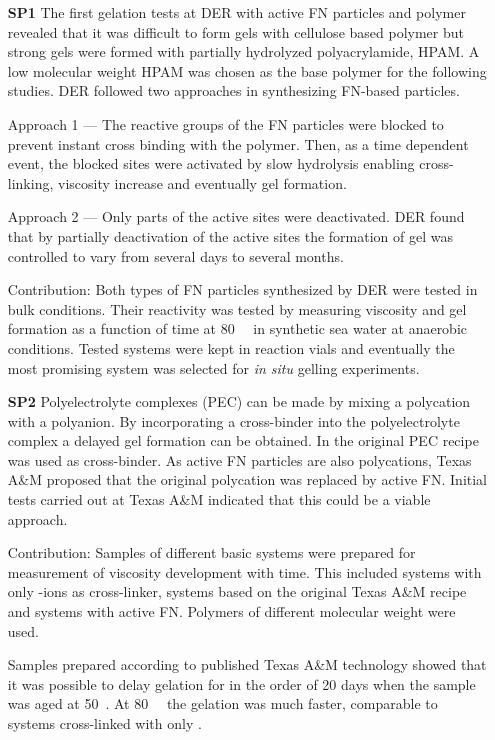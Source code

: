 \begin{itemize}
    \item [\textbf{SP1}] The first gelation tests at DER with active FN particles and polymer revealed that it was difficult to form gels with cellulose based polymer but strong gels were formed with partially hydrolyzed polyacrylamide, HPAM. A low molecular weight HPAM was chosen as the base polymer for the following studies. DER followed two approaches in synthesizing FN-based particles. 
    
    Approach 1 --- The reactive groups of the FN particles were blocked to prevent instant cross binding with the polymer. Then, as a time dependent event, the blocked sites were activated by slow hydrolysis enabling cross-linking, viscosity increase and eventually gel formation.
    
    Approach 2 --- Only parts of the active sites were deactivated. DER found that by partially deactivation of the active sites the formation of gel was controlled to vary from several days to several months.
    
    {\color{blue} Contribution:} Both types of FN particles synthesized by DER were tested in bulk conditions. Their reactivity was tested by measuring viscosity and gel formation as a function of time at 80~\celsius~ in synthetic sea water at anaerobic conditions. Tested systems were kept in reaction vials and eventually the most promising system  was selected for \emph{in situ} gelling experiments.
    
    \item [\textbf{SP2}] Polyelectrolyte complexes  (PEC) can be made by mixing a polycation with a polyanion. By incorporating a cross-binder into the polyelectrolyte complex a delayed gel formation can be obtained. In the original PEC recipe  was used as cross-binder. As active FN particles are also polycations, Texas A\&M proposed that the original polycation was replaced by active FN. Initial tests carried out at Texas A\&M indicated that this could be a viable approach.
    
    {\color{blue} Contribution:} Samples of different basic systems were prepared for measurement of viscosity development with time. This included systems with only -ions as cross-linker, systems based on the original Texas A\&M recipe and systems with active FN. Polymers of different molecular weight were used.
    
    Samples prepared according to published Texas A\&M technology showed that it was possible to delay gelation for in the order of 20 days when the sample was aged at 50~\celsius. At 80~\celsius~ the gelation was much faster, comparable to systems cross-linked with only .
    

\end{itemize}
